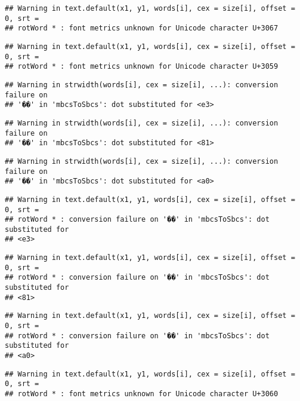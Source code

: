 \documentclass[]{article}
\begin{document}
\begin{verbatim}
## Warning in text.default(x1, y1, words[i], cex = size[i], offset = 0, srt =
## rotWord * : font metrics unknown for Unicode character U+3067
\end{verbatim}

\begin{verbatim}
## Warning in text.default(x1, y1, words[i], cex = size[i], offset = 0, srt =
## rotWord * : font metrics unknown for Unicode character U+3059
\end{verbatim}

\begin{verbatim}
## Warning in strwidth(words[i], cex = size[i], ...): conversion failure on
## '��' in 'mbcsToSbcs': dot substituted for <e3>
\end{verbatim}

\begin{verbatim}
## Warning in strwidth(words[i], cex = size[i], ...): conversion failure on
## '��' in 'mbcsToSbcs': dot substituted for <81>
\end{verbatim}

\begin{verbatim}
## Warning in strwidth(words[i], cex = size[i], ...): conversion failure on
## '��' in 'mbcsToSbcs': dot substituted for <a0>
\end{verbatim}

\begin{verbatim}
## Warning in text.default(x1, y1, words[i], cex = size[i], offset = 0, srt =
## rotWord * : conversion failure on '��' in 'mbcsToSbcs': dot substituted for
## <e3>
\end{verbatim}

\begin{verbatim}
## Warning in text.default(x1, y1, words[i], cex = size[i], offset = 0, srt =
## rotWord * : conversion failure on '��' in 'mbcsToSbcs': dot substituted for
## <81>
\end{verbatim}

\begin{verbatim}
## Warning in text.default(x1, y1, words[i], cex = size[i], offset = 0, srt =
## rotWord * : conversion failure on '��' in 'mbcsToSbcs': dot substituted for
## <a0>
\end{verbatim}

\begin{verbatim}
## Warning in text.default(x1, y1, words[i], cex = size[i], offset = 0, srt =
## rotWord * : font metrics unknown for Unicode character U+3060
\end{verbatim}
\end{document}
